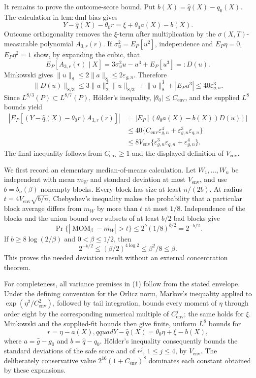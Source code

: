 It remains to prove the outcome-score bound.  Put \(b(X)=\widehat q(X)-q_0(X)\).  The calculation in \(\mathrm{lem:dml\mbox{-}bias}\) gives
\[
Y-\widehat q(X)-\theta_0r=\xi+\theta_0a(X)-b(X).
\]
Outcome orthogonality removes the \(\xi\)-term after multiplication by the \(\sigma(X,T)\)-measurable polynomial \(A_{3,r}(r)\).  If \(\sigma_u^2=E_P[u^2]\), independence and \(E_P\eta=0\), \(E_P\eta^2=1\) show, by expanding the cubic, that
\[
E_P[A_{3,r}(r)\mid X]
=3\sigma_u^2u-u^3+E_P[u^3]=:D(u).
\]
Minkowski gives \(\lVert u\rVert_8\le2\lVert a\rVert_8\le2\varepsilon_{g,n}\).  Therefore
\[
\lVert D(u)\rVert_{8/3}
\le3\lVert u\rVert_2^2\lVert u\rVert_{8/3}
 +\lVert u\rVert_8^3+|E_Pu^3|
\le40\varepsilon_{g,n}^3.
\]
Since \(L^{8/3}(P)\subset L^{8/7}(P)\), H\"older's inequality, \(|\theta_0|\le C_{\mathrm{env}}\), and the supplied \(L^8\) bounds yield
\[
\begin{aligned}
\left|E_P[(Y-\widehat q(X)-\theta_0r)A_{3,r}(r)]\right|
&=\left|E_P[(\theta_0a(X)-b(X))D(u)]\right|\\
&\le40\{C_{\mathrm{env}}\varepsilon_{g,n}^4
 +\varepsilon_{g,n}^3\varepsilon_{q,n}\}\\
&\le8V_{\mathrm{env}}\{\varepsilon_{g,n}^3\varepsilon_{q,n}
 +\varepsilon_{g,n}^4\}.
\end{aligned}
\]
The final inequality follows from \(C_{\mathrm{env}}\ge1\) and the displayed definition of \(V_{\mathrm{env}}\).

We first record an elementary median-of-means calculation.  Let \(W_1,\ldots,W_n\) be independent with mean \(m_W\) and standard deviation at most \(V_{\mathrm{env}}\), and use \(b=b_n(\beta)\) nonempty blocks.  Every block has size at least \(n/(2b)\).  At radius \(t=4V_{\mathrm{env}}\sqrt{b/n}\), Chebyshev's inequality makes the probability that a particular block average differs from \(m_W\) by more than \(t\) at most \(1/8\).  Independence of the blocks and the union bound over subsets of at least \(b/2\) bad blocks give
\[
\Pr\{|\operatorname{MOM}_{\beta}-m_W|>t\}
\le 2^b(1/8)^{b/2}=2^{-b/2}.
\]
If \(b\ge8\log(2/\beta)\) and \(0<\beta\le1/2\), then
\[
2^{-b/2}\le(\beta/2)^{4\log2}\le\beta^2/8\le\beta.
\tag{1}
\]
This proves the needed deviation result without an external concentration theorem.

For completeness, all variance premises in (1) follow from the stated envelope.  Under the defining convention for the Orlicz norm, Markov's inequality applied to \(\exp(\eta^2/C_{\mathrm{env}}^2)\), followed by tail integration, bounds every moment of \(\eta\) through order eight by the corresponding numerical multiple of \(C_{\mathrm{env}}^j\); the same holds for \(\xi\).  Minkowski and the supplied-fit bounds then give finite, uniform \(L^8\) bounds for
\[
r=\eta-a(X),qquad
Y-\widehat q(X)=\theta_0\eta+\xi-b(X),
\]
where \(a=\widehat g-g_0\) and \(b=\widehat q-q_0\).  H\"older's inequality consequently bounds the standard deviations of the safe score and of \(r^j\), \(1\le j\le4\), by \(V_{\mathrm{env}}\).  The deliberately conservative value \(2^{16}(1+C_{\mathrm{env}})^8\) dominates each constant obtained by these expansions.

